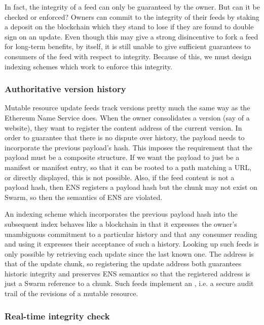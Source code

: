 In fact, the integrity of a feed can only be guaranteed by the owner. But can it be checked or enforced? Owners can commit to the integrity of their feeds by staking a deposit on the blockchain which they stand to lose if they are found to double sign on an update. Even though this may give a strong disincentive to fork a feed for long-term benefits, by itself, it is still unable to give sufficient guarantees to consumers of the feed with respect to integrity. Because of this, we must design indexing schemes which work to enforce this integrity.

\subsubsection{Authoritative version history}

Mutable resource update feeds track versions pretty much the same way as the Ethereum Name Service does.  
When the owner consolidates a version (say of a   website), they want to register the content address of the current version. In order to guarantee that there is no dispute over history, the payload needs to incorporate the previous payload's hash. This imposes the requirement that the payload must be a composite structure. If we want the payload to just be a manifest or manifest entry, so that it can be rooted to a path matching a URL, or directly displayed, this is not possible. Also, if the feed content is not a payload hash, then ENS registers a payload hash but the chunk may not exist on Swarm, so then the semantics of ENS are violated.

An indexing scheme which incorporates the previous payload hash into the subsequent index behaves like a blockchain in that it expresses the owner's unambiguous commitment to a particular history and that any consumer reading and using it expresses their acceptance of such a history. 
Looking up such feeds is only possible by retrieving each update since the last known one. The address is that of the update chunk, so registering the update address both guarantees historic integrity and preserves ENS semantics so that the registered address is just a Swarm reference to a chunk.
Such feeds implement an , i.e. a secure audit trail of the revisions of a mutable resource. 

\subsubsection{Real-time integrity check}

